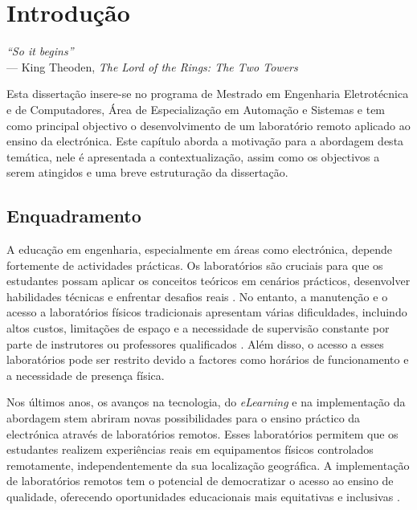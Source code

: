
\chapter{Introdução} 	%
\label{Capítulo1} 		%

\begin{flushright}
\textit{``So it begins''} \\[0.5em]
--- King Theoden, \textit{The Lord of the Rings: The Two Towers}
\end{flushright}
Esta dissertação insere-se no programa de Mestrado em Engenharia Eletrotécnica e de Computadores, Área de Especialização em Automação e Sistemas e tem como principal objectivo o desenvolvimento de um laboratório remoto aplicado ao ensino da electrónica.
Este capítulo aborda a motivação para a abordagem desta temática, nele é apresentada a contextualização, assim como os objectivos a serem atingidos e uma breve estruturação da dissertação.

\section{Enquadramento}
\label{sec: Enquadramento}
A educação em engenharia, especialmente em áreas como electrónica, depende fortemente de actividades prácticas. Os laboratórios são cruciais para que os estudantes possam aplicar os conceitos teóricos em cenários prácticos, desenvolver habilidades técnicas e enfrentar desafios reais \cite{Hofstein, BRINSON2015218}. No entanto, a manutenção e o acesso a laboratórios físicos tradicionais apresentam várias dificuldades, incluindo altos custos, limitações de espaço e a necessidade de supervisão constante por parte de instrutores ou professores qualificados \cite{feisel}. Além disso, o acesso a esses laboratórios pode ser restrito devido a factores como horários de funcionamento e a necessidade de presença física.

Nos últimos anos, os avanços na tecnologia, do \textit{eLearning} e na implementação da abordagem \acrfull{stem} abriram novas possibilidades para o ensino práctico da electrónica através de laboratórios remotos. Esses laboratórios permitem que os estudantes realizem experiências reais em equipamentos físicos controlados remotamente, independentemente da sua localização geográfica. A implementação de laboratórios remotos tem o potencial de democratizar o acesso ao ensino de qualidade, oferecendo oportunidades educacionais mais equitativas e inclusivas \cite{CORTER20112054}.

